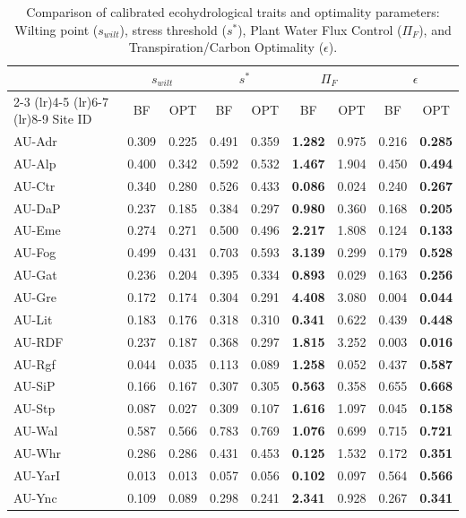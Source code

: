 \documentclass[11pt,a4paper]{article}
\begin{document}
\begin{table}[H]
\centering
\caption{Comparison of calibrated ecohydrological traits and optimality parameters: Wilting point ($s_{wilt}$), stress threshold ($s^*$), Plant Water Flux Control ($\Pi_F$), and Transpiration/Carbon Optimality ($\epsilon$).}
\label{tab:traits_comp}
\begin{tabular}{lcccccccc}
\toprule
 & \multicolumn{2}{c}{$s_{wilt}$} & \multicolumn{2}{c}{$s^*$} & \multicolumn{2}{c}{$\Pi_F$} & \multicolumn{2}{c}{$\epsilon$} \\
\cmidrule(lr){2-3} \cmidrule(lr){4-5} \cmidrule(lr){6-7} \cmidrule(lr){8-9}
Site ID & BF & OPT & BF & OPT & BF & OPT & BF & OPT \\
\midrule
AU-Adr & 0.309 & 0.225 & 0.491 & 0.359 & \textbf{1.282} & 0.975 & 0.216 & \textbf{0.285} \\
AU-Alp & 0.400 & 0.342 & 0.592 & 0.532 & \textbf{1.467} & 1.904 & 0.450 & \textbf{0.494} \\
AU-Ctr & 0.340 & 0.280 & 0.526 & 0.433 & \textbf{0.086} & 0.024 & 0.240 & \textbf{0.267} \\
AU-DaP & 0.237 & 0.185 & 0.384 & 0.297 & \textbf{0.980} & 0.360 & 0.168 & \textbf{0.205} \\
AU-Eme & 0.274 & 0.271 & 0.500 & 0.496 & \textbf{2.217} & 1.808 & 0.124 & \textbf{0.133} \\
AU-Fog & 0.499 & 0.431 & 0.703 & 0.593 & \textbf{3.139} & 0.299 & 0.179 & \textbf{0.528} \\
AU-Gat & 0.236 & 0.204 & 0.395 & 0.334 & \textbf{0.893} & 0.029 & 0.163 & \textbf{0.256} \\
AU-Gre & 0.172 & 0.174 & 0.304 & 0.291 & \textbf{4.408} & 3.080 & 0.004 & \textbf{0.044} \\
AU-Lit & 0.183 & 0.176 & 0.318 & 0.310 & \textbf{0.341} & 0.622 & 0.439 & \textbf{0.448} \\
AU-RDF & 0.237 & 0.187 & 0.368 & 0.297 & \textbf{1.815} & 3.252 & 0.003 & \textbf{0.016} \\
AU-Rgf & 0.044 & 0.035 & 0.113 & 0.089 & \textbf{1.258} & 0.052 & 0.437 & \textbf{0.587} \\
AU-SiP & 0.166 & 0.167 & 0.307 & 0.305 & \textbf{0.563} & 0.358 & 0.655 & \textbf{0.668} \\
AU-Stp & 0.087 & 0.027 & 0.309 & 0.107 & \textbf{1.616} & 1.097 & 0.045 & \textbf{0.158} \\
AU-Wal & 0.587 & 0.566 & 0.783 & 0.769 & \textbf{1.076} & 0.699 & 0.715 & \textbf{0.721} \\
AU-Whr & 0.286 & 0.286 & 0.431 & 0.453 & \textbf{0.125} & 1.532 & 0.172 & \textbf{0.351} \\
AU-YarI & 0.013 & 0.013 & 0.057 & 0.056 & \textbf{0.102} & 0.097 & 0.564 & \textbf{0.566} \\
AU-Ync & 0.109 & 0.089 & 0.298 & 0.241 & \textbf{2.341} & 0.928 & 0.267 & \textbf{0.341} \\
\bottomrule
\end{tabular}
\end{table}
\end{document}
